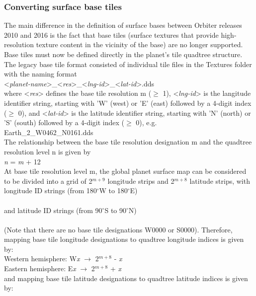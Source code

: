 \documentclass[Orbiter Developer Manual.tex]{subfiles}
\begin{document}
\subsubsection{Converting surface base tiles}
The main difference in the definition of surface bases between Orbiter releases 2010 and 2016 is the fact that base tiles (surface textures that provide high-resolution texture content in the vicinity of the base) are no longer supported. Base tiles must now be defined directly in the planet's tile quadtree structure.\\
The legacy base tile format consisted of individual tile files in the Textures folder with the naming format\\
\indent <\textit{planet-name}>\_<\textit{res}>\_<\textit{lng-id}>\_<\textit{lat-id}>.dds\\
where <\textit{res}> defines the base tile resolution m ($\geq$ 1), <\textit{lng-id}> is the langitude identifier string, starting with 'W' (west) or 'E' (east) followed by a 4-digit index ($\geq$ 0), and <\textit{lat-id}> is the latitude identifier string, starting with 'N' (north) or 'S' (south) followed by a 4-digit index ($\geq$ 0), e.g.\\
\indent Earth\_2\_W0462\_N0161.dds\\
The relationship between the base tile resolution designation m and the quadtree resolution level n is given by\\
\indent \textit{n} = \textit{m} + 12\\
At base tile resolution level m, the global planet surface map can be considered to be divided into a grid of 2$^{m+9}$ longitude strips and 2$^{m+8}$ latitude strips, with longitude ID strings (from 180$^{\circ}$W to 180$^{\circ}$E)\\
\indent [W2$^{m+8}$, ... , W0001, E0000, E2$^{m+8}$-1]\\
and latitude ID strings (from 90$^{\circ}$S to 90$^{\circ}$N)\\
\indent [S2$^{m+7}$, ... , S0001, N0000, N2$^{m+7}$-1]\\
(Note that there are no base tile designations W0000 or S0000). Therefore, mapping base tile longitude designations to quadtree longitude indices is given by:\\
\indent Western hemisphere: W\textit{x} $\rightarrow$ 2$^{m+8}$ - \textit{x}\\
\indent Eastern hemisphere: E\textit{x} $\rightarrow$ 2$^{m+8}$ + \textit{x}\\
and mapping base tile latitude designations to quadtree latitude indices is given by:\\
\end{document}
